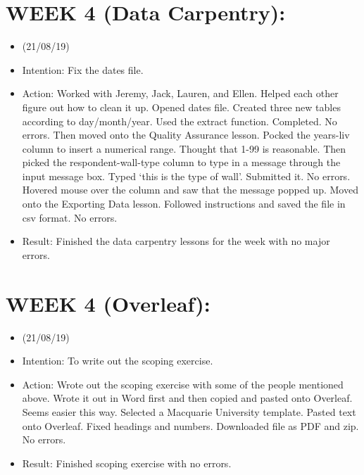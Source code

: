 \documentclass[a4paper,12pt]{article}
\begin{document}
\section{WEEK 4 (Data Carpentry):}

\begin{itemize}
    \item 

(21/08/19)

\item Intention: Fix the dates file.

\item{Action: Worked with Jeremy, Jack, Lauren, and Ellen. Helped each other figure out how to clean it up. Opened dates file. Created three new tables according to day/month/year. Used the extract function. Completed. No errors. Then moved onto the Quality Assurance lesson. Pocked the years-liv column to insert a numerical range. Thought that 1-99 is reasonable. Then picked the respondent-wall-type column to type in a message through the input message box. Typed ‘this is the type of wall’. Submitted it. No errors. Hovered mouse over the column and saw that the message popped up. Moved onto the Exporting Data lesson. Followed instructions and saved the file in csv format. No errors.}

\item{Result: Finished the data carpentry lessons for the week with no major errors.}

\end{itemize}

\section{WEEK 4 (Overleaf):}

\begin{itemize}
    \item 

(21/08/19)

\item Intention: To write out the scoping exercise. 

\item{Action: Wrote out the scoping exercise with some of the people mentioned above. Wrote it out in Word first and then copied and pasted onto Overleaf. Seems easier this way. Selected a Macquarie University template. Pasted text onto Overleaf. Fixed headings and numbers. Downloaded file as PDF and zip. No errors.} 

\item{Result: Finished scoping exercise with no errors.}

\end{itemize}
\end{document}
